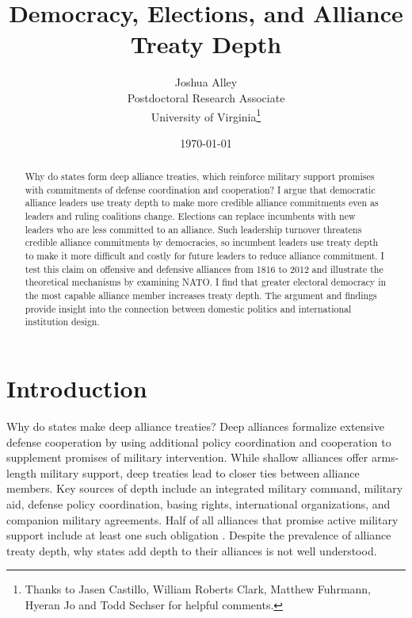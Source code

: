 \documentclass[12pt]{article}
\title{\textbf{Democracy, Elections, and Alliance Treaty Depth}}
\author{Joshua Alley \\
Postdoctoral Research Associate \\
University of Virginia\thanks{Thanks to Jasen Castillo, William Roberts Clark, Matthew Fuhrmann, Hyeran Jo and Todd Sechser for helpful comments.} 
}
\date{\today}
\begin{document}
\maketitle 

\doublespace 

\begin{abstract}
Why do states form deep alliance treaties, which reinforce military support promises with commitments of defense coordination and cooperation? 
I argue that democratic alliance leaders use treaty depth to make more credible alliance commitments even as leaders and ruling coalitions change. 
Elections can replace incumbents with new leaders who are less committed to an alliance. 
Such leadership turnover threatens credible alliance commitments by democracies, so incumbent leaders use treaty depth to make it more difficult and costly for future leaders to reduce alliance commitment. 
I test this claim on offensive and defensive alliances from 1816 to 2012 and illustrate the theoretical mechanisms by examining NATO.
I find that greater electoral democracy in the most capable alliance member increases treaty depth. 
The argument and findings provide insight into the connection between domestic politics and international institution design. 
\end{abstract}


\newpage 


\section{Introduction}


Why do states make deep alliance treaties? 
Deep alliances formalize extensive defense cooperation by using additional policy coordination and cooperation to supplement promises of military intervention. 
While shallow alliances offer arms-length military support, deep treaties lead to closer ties between alliance members. 
Key sources of depth include an integrated military command, military aid, defense policy coordination, basing rights, international organizations, and companion military agreements.
Half of all alliances that promise active military support include at least one such obligation \citep{Leedsetal2002}. 
Despite the prevalence of alliance treaty depth, why states add depth to their alliances is not well understood. 
\end{document}
